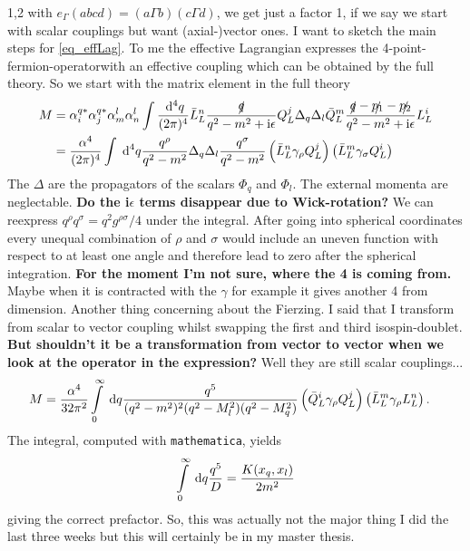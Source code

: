\documentclass[11pt,a4paper,twoside]{article}
\begin{document}
\begin{spacing}{1,2}
\noindent 
with $e_\Gamma(abcd) = (a\Gamma b)(c\Gamma d)$, we get just a factor 1, if we say we start with scalar couplings but want (axial-)vector ones. I want to sketch the main steps for \eqref{eq_effLag}. 
To me the effective Lagrangian expresses the 4-point-fermion-operatorwith an effective coupling which can be obtained by the full theory. 
So we start with the matrix element in the full theory
\begin{align}
 M &= \alpha_i^{q*} \alpha_j^{q*} \alpha_m^l \alpha_n^l \int \frac{\; \mathrm{d}^4 q}{(2\pi)^4} \bar L_L^n \frac{\slashed{q}}{q^2-m^2+\text{i}\epsilon}Q_L^j \Delta_q \Delta_l \bar Q_L^m \frac{\slashed{q}-\slashed{p_1}-\slashed{p_2}}{q^2-m^2+\text{i}\epsilon}L_L^i\\
 &=\frac{\alpha^4}{(2\pi)^4} \int \; \mathrm{d}^4 q \frac{q^\rho}{q^2-m^2}\Delta_q \Delta_l \frac{q^\sigma}{q^2-m^2} \left(\bar L_L^n \gamma_\rho Q_L^j\right)\left(\bar L_L^m \gamma_\sigma Q_L^i\right)
\end{align}
The $\Delta$ are the propagators of the scalars $\Phi_q$ and $\Phi_l$. The external momenta are neglectable. \textbf{Do the i$\epsilon$ terms disappear due to
Wick-rotation?} We can reexpress $q^\rho q^\sigma = q^2 g^{\rho\sigma}/4$ under the integral. After going into spherical coordinates every unequal combination
of $\rho$ and $\sigma$ would include an uneven function with respect to at least one angle and therefore lead to zero after the spherical integration. 
\textbf{For the moment I'm not sure, where the 4 is coming from.} Maybe when it is contracted with the $\gamma$ for example it gives another 4 from dimension.
Another thing concerning about the Fierzing. I said that I transform from scalar to vector coupling whilst
swapping the first and third isospin-doublet. \textbf{But shouldn't it be a transformation from vector to vector when we look at the operator in the expression?}
Well they are still scalar couplings... 
\begin{align}
 M &= \frac{\alpha^4}{32\pi^2} \int\limits_0^\infty \; \mathrm{d} q \frac{q^5}{(q^2-m^2)^2(q^2-M_l^2)(q^2-M_q^2)} \left(\bar Q_L^i \gamma_\rho Q_L^j\right)\left(\bar L_L^m \gamma_\rho L_L^n\right).
\end{align}
The integral, computed with \texttt{mathematica}, yields
\begin{align}
 \int \limits_0^\infty \; \mathrm{d} q \frac{q^5}{D} = \frac{K(x_q,x_l)}{2m^2}
\end{align}
giving the correct prefactor. So, this was actually not the major thing I did the last three weeks but this will certainly be in my master thesis. 

\end{spacing}
\end{document}
